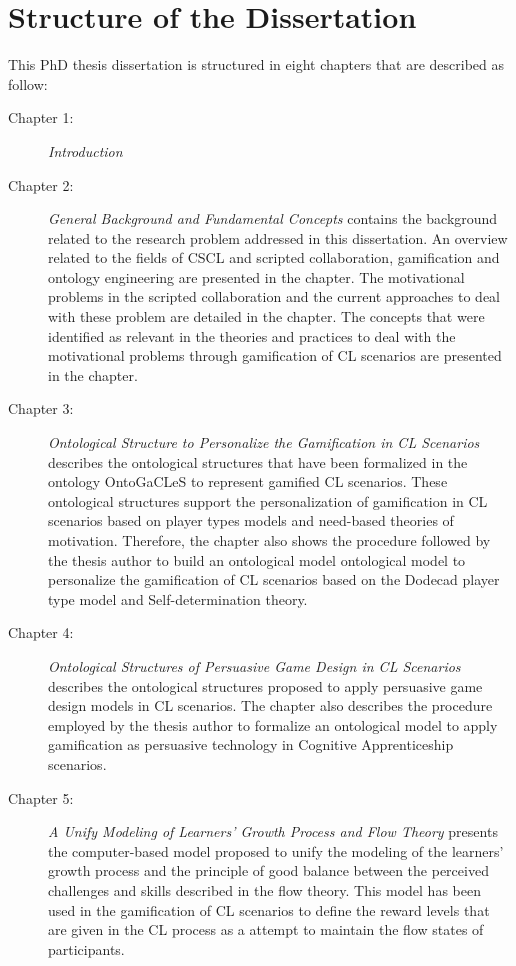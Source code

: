 \section{Structure of the Dissertation}
\label{sec:structure-of-dissertation}

This PhD thesis dissertation is structured in eight chapters that are described as follow:

\begin{description}

\item[Chapter 1:]
\emph{Introduction}

\item[Chapter 2:]
\emph{General Background and Fundamental Concepts} contains the background related to the research problem addressed in this dissertation.
An overview related to the fields of CSCL and scripted collaboration, gamification and ontology engineering are presented in the chapter.
The motivational problems in the scripted collaboration and the current approaches to deal with these problem are detailed in the chapter.
The concepts that were identified as relevant in the theories and practices to deal with the motivational problems through gamification of CL scenarios are presented in the chapter.

\item[Chapter 3:]
\emph{Ontological Structure to Personalize the Gamification in CL Scenarios} describes the ontological structures that have been formalized in the ontology OntoGaCLeS to represent gamified CL scenarios.
These ontological structures support the personalization of gamification in CL scenarios based on player types models and need-based theories of motivation.
Therefore, the chapter also shows the procedure followed by the thesis author to build an ontological model ontological model to personalize the gamification of CL scenarios based on the Dodecad player type model and Self-determination theory.

\item[Chapter 4:]
\emph{Ontological Structures of Persuasive Game Design in CL Scenarios} describes the ontological structures proposed to apply persuasive game design models in CL scenarios.
The chapter also describes the procedure employed by the thesis author to formalize an ontological model to apply gamification as persuasive technology in Cognitive Apprenticeship scenarios.

\item[Chapter 5:]
\emph{A Unify Modeling of Learners' Growth Process and Flow Theory} presents the computer-based model proposed to unify the modeling of the learners' growth process and the principle of good balance between the perceived challenges and skills described in the flow theory.
This model has been used in the gamification of CL scenarios to define the reward levels that are given in the CL process as a attempt to maintain the flow states of participants.


\end{description}
